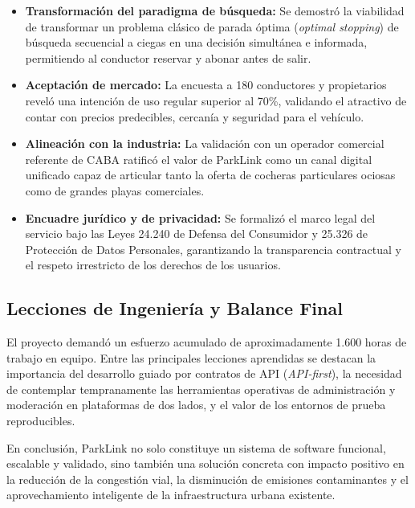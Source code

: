 \begin{itemize}
    \item \textbf{Transformación del paradigma de búsqueda:} Se demostró la viabilidad de transformar un problema clásico de parada óptima (\textit{optimal stopping}) de búsqueda secuencial a ciegas en una decisión simultánea e informada, permitiendo al conductor reservar y abonar antes de salir.
    \item \textbf{Aceptación de mercado:} La encuesta a 180 conductores y propietarios reveló una intención de uso regular superior al 70\%, validando el atractivo de contar con precios predecibles, cercanía y seguridad para el vehículo.
    \item \textbf{Alineación con la industria:} La validación con un operador comercial referente de CABA ratificó el valor de ParkLink como un canal digital unificado capaz de articular tanto la oferta de cocheras particulares ociosas como de grandes playas comerciales.
    \item \textbf{Encuadre jurídico y de privacidad:} Se formalizó el marco legal del servicio bajo las Leyes 24.240 de Defensa del Consumidor y 25.326 de Protección de Datos Personales, garantizando la transparencia contractual y el respeto irrestricto de los derechos de los usuarios.
\end{itemize}

\subsection{Lecciones de Ingeniería y Balance Final}

El proyecto demandó un esfuerzo acumulado de aproximadamente 1.600 horas de trabajo en equipo. Entre las principales lecciones aprendidas se destacan la importancia del desarrollo guiado por contratos de API (\textit{API-first}), la necesidad de contemplar tempranamente las herramientas operativas de administración y moderación en plataformas de dos lados, y el valor de los entornos de prueba reproducibles.

En conclusión, ParkLink no solo constituye un sistema de software funcional, escalable y validado, sino también una solución concreta con impacto positivo en la reducción de la congestión vial, la disminución de emisiones contaminantes y el aprovechamiento inteligente de la infraestructura urbana existente.
